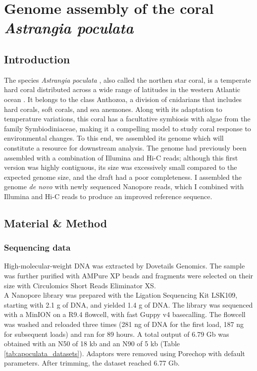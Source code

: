 
\chapter{Genome assembly of the coral \textit{Astrangia poculata}}

\section{Introduction}

The species \textit{Astrangia poculata} \cite{peters1988nomenclature}, also called the northen star coral, is a temperate hard coral distributed across a wide range of latitudes in the western Atlantic ocean \cite{dimond2013simple}. It belongs to the class Anthozoa, a division of cnidarians that includes hard corals, soft corals, and sea anemones. Along with its adaptation to temperature variations, this coral has a facultative symbiosis with algae from the family Symbiodiniaceae, making it a compelling model to study coral response to environmental changes. To this end, we assembled its genome which will constitute a resource for downstream analysis. The genome had previously been assembled with a combination of Illumina and Hi-C reads; although this first version was highly contiguous, its size was excessively small compared to the expected genome size, and the draft had a poor completeness. I assembled the genome \textit{de novo} with newly sequenced Nanopore reads, which I combined with Illumina and Hi-C reads to produce an improved reference sequence. 

\section{Material \& Method}

\subsection{Sequencing data}

High-molecular-weight DNA was extracted by Dovetails Genomics. The sample was further purified with AMPure XP beads and fragments were selected on their size with Circulomics Short Reads Eliminator XS. \\
A Nanopore library was prepared with the Ligation Sequencing Kit LSK109, starting with 2.1 {\textmu}g of DNA, and yielded 1.4 {\textmu}g of DNA. The library was sequenced with a MinION on a R9.4 flowcell, with fast Guppy v4 basecalling. The flowcell was washed and reloaded three times (281 ng of DNA for the first load, 187 ng for subsequent loads) and ran for 89 hours. A total output of 6.79 Gb was obtained with an N50 of 18 kb and an N90 of 5 kb (Table \ref{tab:apoculata_datasets}). Adaptors were removed using Porechop \cite{porechop} with default parameters. After trimming, the dataset reached 6.77 Gb. \\

